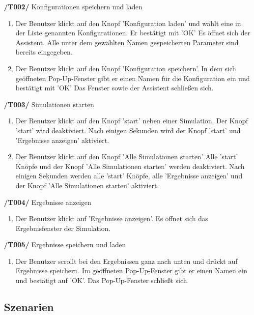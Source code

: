 \textbf{/T002/} Konfigurationen speichern und laden
\begin{enumerate}
\item {}
		{Der Benutzer klickt auf den Knopf 'Konfiguration laden' und wählt eine in der Liste genannten Konfigurationen. Er bestätigt mit 'OK'}
		{Es öffnet sich der Assistent. Alle unter dem gewählten Namen gespeicherten Parameter sind bereits eingegeben.}

\item {}
		{Der Benutzer klickt auf den Knopf 'Konfiguration speichern'. In dem sich geöffneten Pop-Up-Fenster gibt er einen Namen für die Konfiguration ein und bestätigt mit 'OK'}
		{Das Fenster sowie der Assistent schließen sich.}
\end{enumerate}

\textbf{/T003/} Simulationen starten
\begin{enumerate}
\item {}
		{Der Benutzer klickt auf den Knopf 'start' neben einer Simulation.}
		{Der Knopf 'start' wird deaktiviert. Nach einigen Sekunden wird der Knopf 'start' und 'Ergebnisse anzeigen' aktiviert.}
		
\item {}
		{Der Benutzer klickt auf den Knopf 'Alle Simulationen starten'}
		{Alle 'start' Knöpfe und der Knopf 'Alle Simulationen starten' werden deaktiviert. Nach einigen Sekunden werden alle 'start' Knöpfe, alle 'Ergebnisse anzeigen' und der Knopf 'Alle Simulationen starten' aktiviert.}
\end{enumerate}

\textbf{/T004/} Ergebnisse anzeigen
\begin{enumerate}
\item {}
		{Der Benutzer klickt auf 'Ergebnisse anzeigen'.}
		{Es öffnet sich das Ergebnisfenster der Simulation.}
\end{enumerate}

\textbf{/T005/} Ergebnisse speichern und laden
\begin{enumerate}
\item {}
		{Der Benutzer scrollt bei den Ergebnissen ganz nach unten und drückt auf Ergebnisse speichern. Im geöffneten Pop-Up-Fenster gibt er einen Namen ein und bestätigt auf 'OK'.}
		{Das Pop-Up-Fenster schließt sich.}
\end{enumerate}


\subsection{Szenarien}


